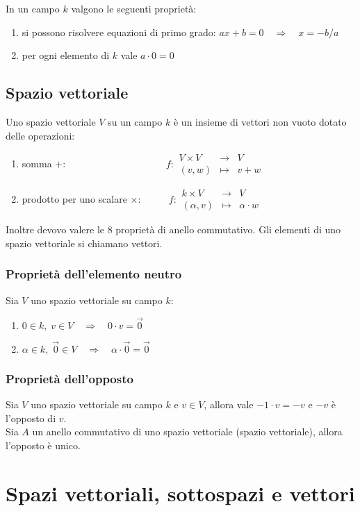 \documentclass[a4paper]{article}
\newcommand\f[4]{\begin{smallmatrix} {#1} &\to &{#2} \\ {#3} &\mapsto &{#4} \end{smallmatrix}}
\begin{document}
In un campo \(k\) valgono le seguenti proprietà:
\begin{enumerate}[topsep=3pt, itemsep=0pt]
	\item si possono risolvere equazioni di primo grado: \(ax + b = 0 \quad \Rightarrow \quad x = -b/a\)
	\item per ogni elemento di \(k\) vale \(a \cdot 0 = 0\)
\end{enumerate}

\subsection{Spazio vettoriale}
Uno spazio vettoriale \(V\) su un campo \(k\) è un insieme di vettori non vuoto dotato delle operazioni:
\begin{enumerate}
	\item somma \(+\): \(\qquad \qquad \qquad \qquad \qquad f : \f{V \times V}{V}{(v, w)}{v + w} \)
	\item prodotto per uno scalare \(\times\): \(\qquad \;\; f : \f{k \times V}{V}{(\alpha, v)}{\alpha \cdot w}\)
\end{enumerate}
Inoltre devovo valere le 8 proprietà di anello commutativo.
Gli elementi di uno spazio vettoriale si chiamano vettori.

\subsubsection*{Proprietà dell'elemento neutro}
Sia \(V\) uno spazio vettoriale su campo \(k\):
\begin{enumerate}[topsep=3pt, itemsep=0pt]
	\item \(0 \in k, \; v \in V \quad \Rightarrow \quad 0 \cdot v = \vec{0}\)
	\item \(\alpha \in k, \; \vec{0} \in V \quad \Rightarrow \quad \alpha \cdot \vec{0} = \vec{0}\)
\end{enumerate}

\subsubsection*{Proprietà dell'opposto}
Sia \(V\) uno spazio vettoriale su campo \(k\) e \(v \in V\), allora vale \(-1 \cdot v = -v\) e \(-v\) è l'opposto di \(v\). \\
Sia \(A\) un anello commutativo di uno spazio vettoriale (spazio vettoriale), allora l'opposto è unico.

\newpage


\section{Spazi vettoriali, sottospazi e vettori}
\end{document}
